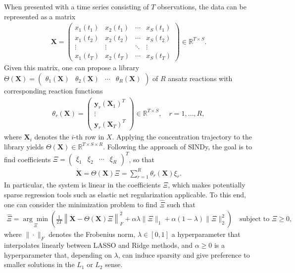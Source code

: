 \documentclass[oneside, abstracton, titlepage]{scrartcl}
\begin{document}
	When presented with a time series consisting of $T$ observations, the data can be represented as a matrix
	\begin{align}
	\textbf{X} = \begin{pmatrix}
		x_1(t_1) & x_2(t_1) & \cdots & x_S(t_1) \\
		x_1(t_2) & x_2(t_2) & \cdots & x_S(t_2) \\
		\vdots   & \vdots   & \ddots & \vdots   \\
		x_1(t_T) & x_2(t_T) & \cdots & x_S(t_T)
	\end{pmatrix} \in \mathbb{R}^{T\times S}.
	\end{align}
	Given this matrix, one can propose a library $\Theta(\textbf{X}) = \begin{pmatrix} \theta_1(\textbf{X}) & \theta_2(\textbf{X}) & \cdots & \theta_R(\textbf{X}) \end{pmatrix}$ of $R$ ansatz reactions with corresponding reaction functions
	\begin{align}
		\theta_r(\textbf{X}) = \begin{pmatrix}
		\textbf{y}_r(\textbf{X}_1)^T \\ \vdots \\ \textbf{y}_r(\textbf{X}_T)^T
		\end{pmatrix}\in \mathbb{R}^{T\times S},\quad r=1,\ldots,R,
	\label{method:the-reactions}\end{align}
	where $\textbf{X}_i$ denotes the $i$-th row in $X$. Applying the concentration trajectory to the library yields $\Theta(\textbf{X})\in\mathbb{R}^{T\times S\times R}$. Following the approach of SINDy, the goal is to find coefficients $\Xi = \begin{pmatrix} \xi_1 & \xi_2 & \cdots & \xi_R
	\end{pmatrix}^T$, so that
	\begin{align}
	\dot{\textbf{X}} = \Theta(\textbf{X})\Xi = \sum_{r=1}^{R}\theta_r(\textbf{X})\xi_r.
	\end{align}
	In particular, the system is linear in the coefficients $\Xi$, which makes potentially sparse regression tools such as elastic net regularization \cite{Zou2005} applicable. To this end, one can consider the minimization problem to find $\hat{\Xi}$ such that
	\begin{align}
		\hat{\Xi} = \underset{\Xi}{\arg\min}\left( \frac{1}{2T}\left\| \dot{\textbf{X}} - \Theta(\textbf{X})\Xi \right\|_F^2 + \alpha\lambda\|\Xi\|_1 + \alpha(1-\lambda)\|\Xi\|_2^2 \right) \quad \text{subject to }\Xi \geq 0,
	\label{method:minimizationproblem}\end{align}
	where $\|\cdot\|_F$ denotes the Frobenius norm, $\lambda\in[0,1]$ a hyperparameter that interpolates linearly between LASSO \cite{Tibshirani1996, Hastie2009} and Ridge \cite{Hoerl1} methods, and $\alpha\geq 0$ is a hyperparameter that, depending on $\lambda$, can induce sparsity and give preference to smaller solutions in the $L_1$ or $L_2$ sense.
\end{document}
